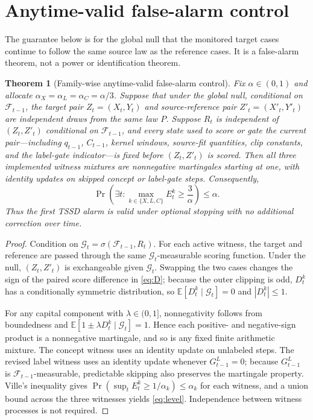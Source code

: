 \documentclass[11pt,a4paper]{article}
\newtheorem{theorem}{Theorem}
\theoremstyle{definition}
\newcommand{\1}{\mathbf{1}}
\begin{document}
\section{Anytime-valid false-alarm control}
\label{sec:validity}

The guarantee below is for the global null that the monitored target cases continue to follow the same source law as the reference cases. It is a false-alarm theorem, not a power or identification theorem.

\begin{theorem}[Family-wise anytime-valid false-alarm control]
\label{thm:validity}
Fix $\alpha\in(0,1)$ and allocate $\alpha_X=\alpha_L=\alpha_C=\alpha/3$. Suppose that under the global null, conditional on $\mathcal F_{t-1}$, the target pair $Z_t=(X_t,Y_t)$ and source-reference pair $Z'_t=(X'_t,Y'_t)$ are independent draws from the same law $P$. Suppose $R_t$ is independent of $(Z_t,Z'_t)$ conditional on $\mathcal F_{t-1}$, and every state used to score or gate the current pair---including $q_{t-1}$, $C_{t-1}$, kernel windows, source-fit quantities, clip constants, and the label-gate indicator---is fixed before $(Z_t,Z'_t)$ is scored. Then all three implemented witness mixtures are nonnegative martingales starting at one, with identity updates on skipped concept or label-gate steps. Consequently,
\begin{equation}
\Pr\!\left(\exists t:\max_{k\in\{X,L,C\}}E_t^k\ge \frac{3}{\alpha}\right)\le\alpha.
\label{eq:level}
\end{equation}
Thus the first TSSD alarm is valid under optional stopping with no additional correction over time.
\end{theorem}

\begin{proof}
Condition on $\mathcal G_t=\sigma(\mathcal F_{t-1},R_t)$. For each active witness, the target and reference are passed through the same $\mathcal G_t$-measurable scoring function. Under the null, $(Z_t,Z'_t)$ is exchangeable given $\mathcal G_t$. Swapping the two cases changes the sign of the paired score difference in \eqref{eq:D}; because the outer clipping is odd, $D_t^k$ has a conditionally symmetric distribution, so $\mathbb E[D_t^k\mid\mathcal G_t]=0$ and $|D_t^k|\le1$.

For any capital component with $\lambda\in(0,1]$, nonnegativity follows from boundedness and
$\mathbb E[1\pm\lambda D_t^k\mid\mathcal G_t]=1$. Hence each positive- and negative-sign product is a nonnegative martingale, and so is any fixed finite arithmetic mixture. The concept witness uses an identity update on unlabeled steps. The revised label witness uses an identity update whenever $G_{t-1}^L=0$; because $G_{t-1}^L$ is $\mathcal F_{t-1}$-measurable, predictable skipping also preserves the martingale property. Ville's inequality gives $\Pr(\sup_t E_t^k\ge1/\alpha_k)\le\alpha_k$ for each witness, and a union bound across the three witnesses yields \eqref{eq:level}. Independence between witness processes is not required.
\end{proof}
\end{document}
